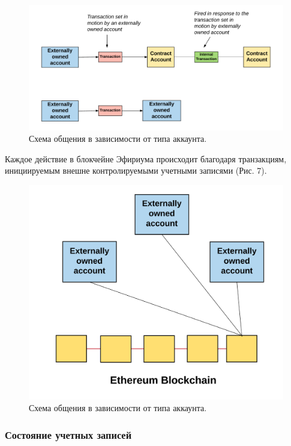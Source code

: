 \documentclass{article}
\begin{document}
\begin{figure}
    \centering
    \includegraphics[scale=0.3]{scheme_6}
    \caption{Схема общения в зависимости от типа аккаунта.}
    \label{fig:scheme_6}
\end{figure}

Каждое действие в блокчейне Эфириума происходит благодаря транзакциям, инициируемым внешне контролируемыми учетными записями (Рис. 7). 


\begin{figure}
    \centering
    \includegraphics[scale=0.25]{scheme_7}
    \caption{Схема общения в зависимости от типа аккаунта.}
    \label{fig:scheme_7}
\end{figure}

\subsubsection{Состояние учетных записей}
\end{document}
